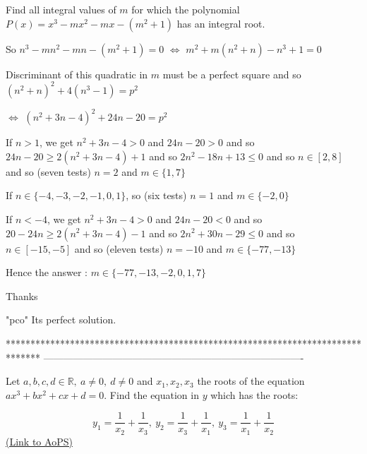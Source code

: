 \begin{solution}
	\begin{tcolorbox}Find all integral values of $m$ for which the polynomial $P(x)=x^3-mx^2-mx-(m^2+1)$ has an integral root.\end{tcolorbox}
So $n^3-mn^2-mn-(m^2+1)=0$ $\iff$ $m^2+m(n^2+n)-n^3+1=0$

Discriminant of this quadratic in $m$ must be a perfect square and so $(n^2+n)^2+4(n^3-1)=p^2$

$\iff$ $(n^2+3n-4)^2+24n-20=p^2$

If $n>1$, we get $n^2+3n-4>0$ and $24n-20>0$ and so $24n-20\ge 2(n^2+3n-4)+1$ and so $2n^2-18n+13\le 0$ and so $n\in[2,8]$ and so (seven tests) $n=2$ and $m\in\{1,7\}$

If $n\in\{-4,-3,-2,-1,0,1\}$, so (six tests) $n=1$ and $m\in\{-2,0\}$

If $n<-4$, we get $n^2+3n-4>0$ and $24n-20<0$ and so $20-24n\ge 2(n^2+3n-4)-1$ and so $2n^2+30n-29\le 0$ and so $n\in[-15,-5]$ and so (eleven tests) $n=-10$ and $m\in\{-77,-13\}$

Hence the answer : $\boxed{m\in\{-77,-13,-2,0,1,7\}}$
\end{solution}



\begin{solution}
	\begin{bolded}Thanks\end{bolded}"pco" Its perfect solution.
\end{solution}
*******************************************************************************
-------------------------------------------------------------------------------

\begin{problem}
	Let $a,b,c,d\in \mathbb{R},\ a\neq 0,\ d\neq 0$ and $x_1,x_2,x_3$ the roots of the equation $ax^3+bx^2+cx+d=0$. Find the equation in $y$ which has the roots:

\[y_1=\frac{1}{x_2}+\frac{1}{x_3},\ y_2=\frac{1}{x_3}+\frac{1}{x_1},\ y_3=\frac{1}{x_1}+\frac{1}{x_2}\]
	\flushright \href{https://artofproblemsolving.com/community/c6h392411}{(Link to AoPS)}
\end{problem}




